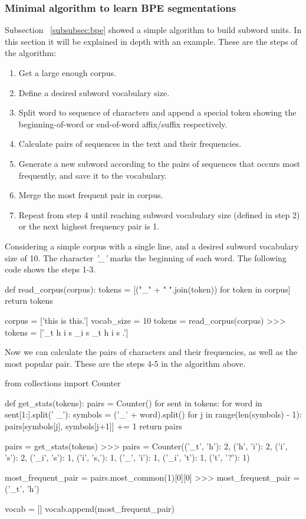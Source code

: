 \subsubsection{Minimal algorithm to learn BPE segmentations}

Subsection ~\ref{subsubsec:bpe} showed a simple algorithm to build subword units. In this section it will be explained in depth with an example. These are the steps of the algorithm:

\begin{enumerate}
    \item Get a large enough corpus.
    \item Define a desired subword vocabulary size.
    \item Split word to sequence of characters and append a special token showing the beginning-of-word or end-of-word affix/suffix respectively.
    \item Calculate pairs of sequences in the text and their frequencies.
    \item Generate a new subword according to the pairs of sequences that occurs most frequently, and save it to the vocabulary.
    \item Merge the most frequent pair in corpus.
    \item Repeat from step 4 until reaching subword vocabulary size (defined in step 2) or the next highest frequency pair is 1.
\end{enumerate}

Considering a simple corpus with a single line, and a desired subword vocabulary size of 10. The character \emph{'\_'} marks the beginning of each word. The following code shows the steps 1-3.

\begin{python}
def read_corpus(corpus):
    tokens = [("_" + " ".join(token)) for token in corpus]
    return tokens

corpus = ['this is this.']
vocab_size = 10
tokens = read_corpus(corpus)
>>> tokens = ['_t h i s _i s _t h i s .']
\end{python}

Now we can calculate the pairs of characters and their frequencies, as well as the most popular pair. These are the steps 4-5 in the algorithm above.

\begin{python}
from collections import Counter

def get_stats(tokens):
  pairs = Counter()
  for sent in tokens:
    for word in sent[1:].split(' _'):
      symbols = ('_' + word).split()
      for j in range(len(symbols) - 1):
        pairs[symbols[j], symbols[j+1]] += 1
  return pairs

pairs = get_stats(tokens)
>>> pairs = Counter({('_t', 'h'): 2, ('h', 'i'): 2, ('i', 's'): 2, 
                    ('_i', 's'): 1, ('i', 's,'): 1, ('_', 'i'): 1, 
                    ('_i', 't'): 1, ('t', '?'): 1})

most_frequent_pair = pairs.most_common(1)[0][0]
>>> most_frequent_pair = ('_t', 'h')

vocab = []
vocab.append(most_frequent_pair)
\end{python}

